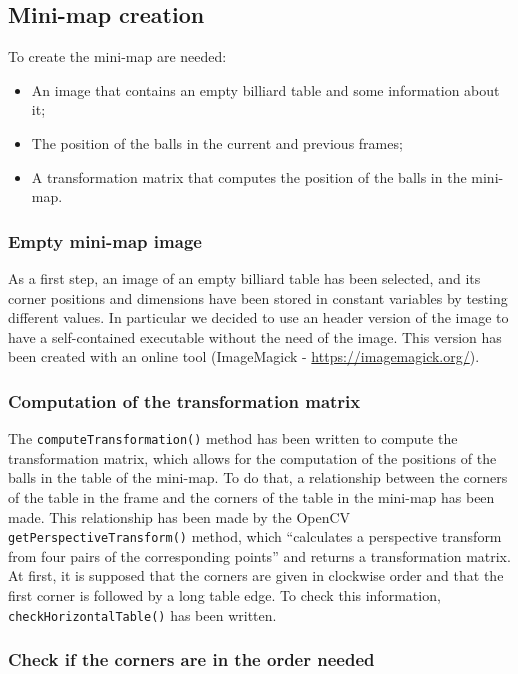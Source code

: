 \subsection{Mini-map creation}

To create the mini-map are needed:
\begin{itemize}
	\item An image that contains an empty billiard table and some information about it;
	\item The position of the balls in the current and previous frames;
	\item A transformation matrix that computes the position of the balls in the mini-map.
\end{itemize}

\subsubsection{Empty mini-map image}

As a first step, an image of an empty billiard table has been selected, and its corner positions and dimensions have been stored in constant variables by testing different values. In particular we decided to use an header version of the image to have a self-contained executable without the need of the image. This version has been created with an online tool (ImageMagick - \url{https://imagemagick.org/}).

\subsubsection{Computation of the transformation matrix}

The \texttt{computeTransformation()} method has been written to compute the transformation matrix, which allows for the computation of the positions of the balls in the table of the mini-map. To do that, a relationship between the corners of the table in the frame and the corners of the table in the mini-map has been made. This relationship has been made by the OpenCV \texttt{getPerspectiveTransform()} method, which “calculates a perspective transform from four pairs of the corresponding points” and returns a transformation matrix. At first, it is supposed that the corners are given in clockwise order and that the first corner is followed by a long table edge. To check this information, \texttt{checkHorizontalTable()} has been written. 

\subsubsection{Check if the corners are in the order needed}


